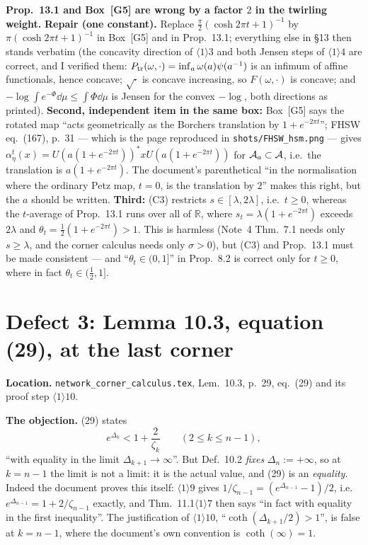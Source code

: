 \documentclass[11pt]{article}
\newcommand{\doc}{\texttt{network\_corner\_calculus.tex}}
\theoremstyle{definition}\newtheorem{example}[theorem]{Example}
\begin{document}
\begin{verdictbreak}
\textbf{Prop.~13.1 and Box~[G5] are wrong by a factor $2$ in the twirling weight.}
\textbf{Repair (one constant).}  Replace $\frac\pi2(\cosh2\pi t+1)^{-1}$ by
$\pi(\cosh2\pi t+1)^{-1}$ in Box~[G5] and in Prop.~13.1; everything else in \S13 then
stands verbatim (the concavity direction of $\langle1\rangle3$ and both Jensen steps of
$\langle1\rangle4$ are correct, and I verified them: $P_{\rm tr}(\omega,\cdot)=\inf_a
\omega(a)\psi(a^{-1})$ is an infimum of affine functionals, hence concave; $\sqrt\cdot$ is
concave increasing, so $F(\omega,\cdot)$ is concave; and $-\log\int e^{-\Phi}\dd\mu\le
\int\Phi\dd\mu$ is Jensen for the convex $-\log$, both directions as printed).
\textbf{Second, independent item in the same box:} Box~[G5] says the rotated map ``acts
geometrically as the Borchers translation by $1+e^{-2\pi t}$''; FHSW eq.~(167), p.~31 ---
which is the page reproduced in \texttt{shots/FHSW\_hsm.png} --- gives
$\alpha^t_\eta(x)=U(a(1+e^{-2\pi t}))^*xU(a(1+e^{-2\pi t}))$ for $\mathcal A_a\subset\mathcal A$, i.e.\
the translation is $a(1+e^{-2\pi t})$.  The document's parenthetical ``in the
normalisation where the ordinary Petz map, $t=0$, is the translation by $2$'' makes this
right, but the $a$ should be written.
\textbf{Third:} (C3) restricts $s\in[\lambda,2\lambda]$, i.e.\ $t\ge0$, whereas the
$t$-average of Prop.~13.1 runs over all of $\mathbb R$, where $s_t=\lambda(1+e^{-2\pi t})$
exceeds $2\lambda$ and $\theta_t=\frac12(1+e^{-2\pi t})>1$.  This is harmless (Note~4
Thm.~7.1 needs only $s\ge\lambda$, and the corner calculus needs only $\sigma>0$), but
(C3) and Prop.~13.1 must be made consistent --- and ``$\theta_t\in(0,1]$'' in Prop.~8.2 is
correct only for $t\ge0$, where in fact $\theta_t\in(\frac12,1]$.
\end{verdictbreak}


\section{Defect 3: Lemma 10.3, equation (29), at the last corner}\label{sec:d3}

\textbf{Location.}  \doc, Lem.~10.3, p.~29, eq.~(29) and its proof step
$\langle1\rangle10$.

\textbf{The objection.}  (29) states
\[
 e^{\Delta_k}<1+\frac2{\zeta_k}\qquad(2\le k\le n-1),
\]
``with equality in the limit $\Delta_{k+1}\to\infty$''.  But Def.~10.2 \emph{fixes}
$\Delta_n:=+\infty$, so at $k=n-1$ the limit is not a limit: it is the actual value, and
(29) is an \emph{equality}.  Indeed the document proves this itself:
$\langle1\rangle9$ gives $1/\zeta_{n-1}=(e^{\Delta_{n-1}}-1)/2$, i.e.\
$e^{\Delta_{n-1}}=1+2/\zeta_{n-1}$ exactly, and Thm.~11.1$\langle1\rangle7$ then says
``in fact with equality in the first inequality''.  The justification of
$\langle1\rangle10$, ``$\coth(\Delta_{k+1}/2)>1$'', is false at $k=n-1$, where the
document's own convention is $\coth(\infty)=1$.
\end{document}
